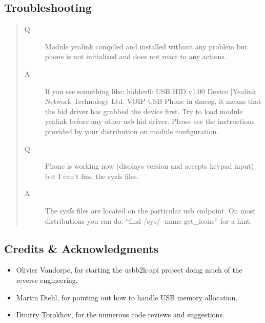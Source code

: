 \documentclass[a4paper,8pt,english]{sphinxmanual}
\begin{document}
\subsection{Troubleshooting}
\label{input/devices/yealink:troubleshooting}\begin{quote}\begin{description}
\item[{Q}] \leavevmode
Module yealink compiled and installed without any problem but phone
is not initialized and does not react to any actions.

\item[{A}] \leavevmode
If you see something like:
hiddev0: USB HID v1.00 Device {[}Yealink Network Technology Ltd. VOIP USB Phone
in dmesg, it means that the hid driver has grabbed the device first. Try to
load module yealink before any other usb hid driver. Please see the
instructions provided by your distribution on module configuration.

\item[{Q}] \leavevmode
Phone is working now (displays version and accepts keypad input) but I can't
find the sysfs files.

\item[{A}] \leavevmode
The sysfs files are located on the particular usb endpoint. On most
distributions you can do: ``find /sys/ -name get\_icons'' for a hint.

\end{description}\end{quote}


\subsection{Credits \& Acknowledgments}
\label{input/devices/yealink:credits-acknowledgments}\begin{itemize}
\item {} 
Olivier Vandorpe, for starting the usbb2k-api project doing much of
the reverse engineering.

\item {} 
Martin Diehl, for pointing out how to handle USB memory allocation.

\item {} 
Dmitry Torokhov, for the numerous code reviews and suggestions.

\end{itemize}



\renewcommand{\indexname}{Index}
\printindex
\end{document}
